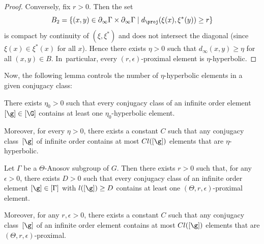 \begin{proof}
Conversely, fix $r>0$. Then the set
\[
B_2 = \{(x,y)\in \partial_\infty \Gamma \times \partial_\infty \Gamma \mid d_\proj(\xi(x),\xi^*(y)) \geq r\}
\]
is compact by continuity of $(\xi,\xi^*)$ and does not intersect the diagonal (since $\xi(x)\in \xi^*(x)$ for all $x$). Hence there exists $\eta>0$ such that $d_\infty(x,y)\geq \eta$ for all $(x,y)\in B$. In~particular, every $(r,\epsilon)$-proximal element is $\eta$-hyperbolic.
\end{proof}

Now, the following lemma controls the number of $\eta$-hyperbolic elements in a given conjugacy class:
\Changel

\begin{lemma} \label{lem - HyperbolicConjugacies}
There exists $\eta_0>0$ such that every conjugacy class of an infinite order element $[\g]\in [\G]$ contains at least one $\eta_0$-hyperbolic element.

Moreover, for every $\eta>0$, there exists a constant $C$ such that any conjugacy class~$[\g]$ of infinite order contains at most $C l([\g])$ elements that are $\eta$-hyperbolic.
\end{lemma}

\begin{coro} \label{lem - ProximalConjugacyClass}
Let $\Gamma$ be a $\Theta$-Anosov subgroup of $G$. Then there exists $r>0$ such that, for any $\epsilon>0$, there exists $D>0$ such that every conjugacy class of an infinite order element $[\g]\in [\Gamma]$ with $l([\g]) \geq D$ contains at least one $(\Theta,r,\epsilon)$-proximal element.

Moreover, for any $r,\epsilon>0$, there exists a constant $C$ such that any conjugacy class~$[\g]$ of an infinite order element contains at most $C l([\g])$ elements that are $(\Theta,r,\epsilon)$\nobreakdash-prox\-imal.
\end{coro}


